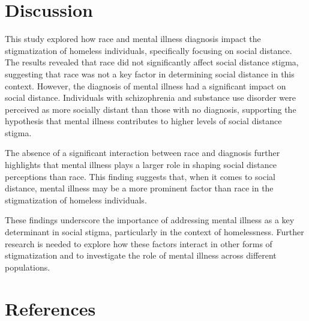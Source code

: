 \documentclass[
  man,
  floatsintext,
  longtable,
  nolmodern,
  notxfonts,
  notimes,
  colorlinks=true,linkcolor=blue,citecolor=blue,urlcolor=blue]{apa7}
\begin{document}
\section{Discussion}\label{discussion}

This study explored how race and mental illness diagnosis impact the
stigmatization of homeless individuals, specifically focusing on social
distance. The results revealed that race did not significantly affect
social distance stigma, suggesting that race was not a key factor in
determining social distance in this context. However, the diagnosis of
mental illness had a significant impact on social distance. Individuals
with schizophrenia and substance use disorder were perceived as more
socially distant than those with no diagnosis, supporting the hypothesis
that mental illness contributes to higher levels of social distance
stigma.

The absence of a significant interaction between race and diagnosis
further highlights that mental illness plays a larger role in shaping
social distance perceptions than race. This finding suggests that, when
it comes to social distance, mental illness may be a more prominent
factor than race in the stigmatization of homeless individuals.

These findings underscore the importance of addressing mental illness as
a key determinant in social stigma, particularly in the context of
homelessness. Further research is needed to explore how these factors
interact in other forms of stigmatization and to investigate the role of
mental illness across different populations.

\section{References}\label{references}
\end{document}
